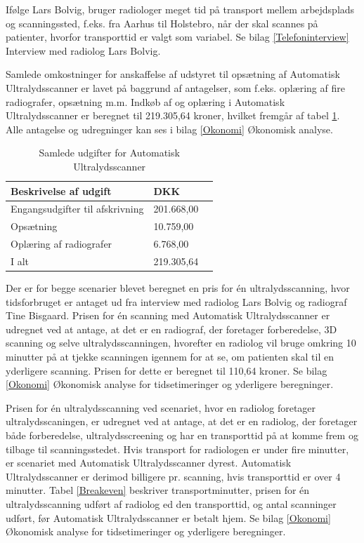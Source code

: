 Ifølge Lars Bolvig, bruger radiologer meget tid på transport mellem arbejdsplads og scanningssted, f.eks. fra Aarhus til Holstebro, når der skal scannes på patienter, hvorfor transporttid er valgt som variabel. Se bilag \ref{Telefoninterview} Interview med radiolog Lars Bolvig. 

Samlede omkostninger for anskaffelse af udstyret til opsætning af Automatisk Ultralydsscanner er lavet på baggrund af antagelser, som f.eks. oplæring af fire radiografer, opsætning m.m. Indkøb af og oplæring i Automatisk Ultralydsscanner er beregnet til 219.305,64 kroner, hvilket fremgår af tabel \ref{FasteOmkostninger}. Alle antagelse og udregninger kan ses i bilag \ref{Okonomi} Økonomisk analyse.

\begin{table}[htb]
\centering
\begin{tabular}{ | l | l | p{} | }
\hline
\textbf{Beskrivelse af udgift} & \textbf{DKK} \\\hline
Engangsudgifter til afskrivning & 201.668,00 \\\hline
Opsætning & 10.759,00 \\\hline
Oplæring af radiografer & 6.768,00 \\\hline
I alt & 219.305,64 \\\hline
\end{tabular}
\caption{Samlede udgifter for Automatisk Ultralydsscanner}
\label{FasteOmkostninger}
\end{table}

Der er for begge scenarier blevet beregnet en pris for én ultralydsscanning, hvor tidsforbruget er antaget ud fra interview med radiolog Lars Bolvig og radiograf Tine Bisgaard. Prisen for én scanning med Automatisk Ultralydsscanner er udregnet ved at antage, at det er en radiograf, der foretager forberedelse, 3D scanning og selve ultralydsscanningen, hvorefter en radiolog vil bruge omkring 10 minutter på at tjekke scanningen igennem for at se, om patienten skal til en yderligere scanning. Prisen for dette er beregnet til 110,64 kroner. Se bilag \ref{Okonomi} Økonomisk analyse for tidsetimeringer og yderligere beregninger. 

Prisen for én ultralydsscanning ved scenariet, hvor en radiolog foretager ultralydsscaningen, er udregnet ved at antage, at det er en radiolog, der foretager både forberedelse, ultralydsscreening og har en transporttid på at komme frem og tilbage til scanningsstedet. Hvis transport for radiologen er under fire minutter, er scenariet med Automatisk Ultralydsscanner dyrest. Automatisk Ultralydsscanner er derimod billigere pr. scanning, hvis transporttid er over 4 minutter. Tabel \ref{Breakeven} beskriver transportminutter, prisen for én ultralydsscanning udført af radiolog ed den transporttid, og antal scanninger udført, før Automatisk Ultralydsscanner er betalt hjem. Se bilag \ref{Okonomi} Økonomisk analyse for tidsetimeringer og yderligere beregninger. 

